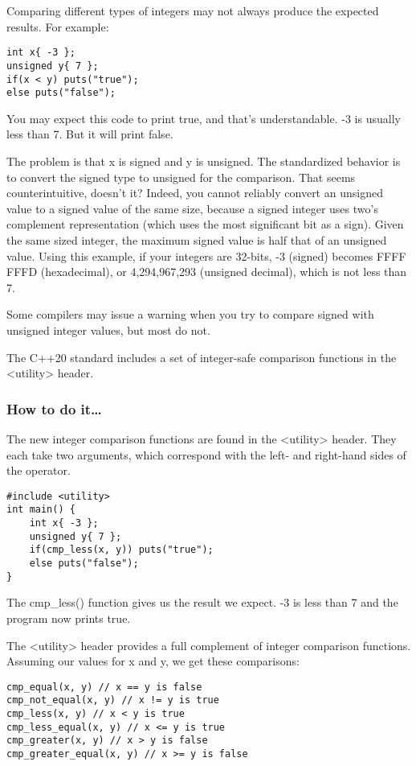 
Comparing different types of integers may not always produce the expected results. For example:

\begin{lstlisting}[style=styleCXX]
int x{ -3 };
unsigned y{ 7 };
if(x < y) puts("true");
else puts("false");
\end{lstlisting}

You may expect this code to print true, and that's understandable. -3 is usually less than 7. But it will print false.

The problem is that x is signed and y is unsigned. The standardized behavior is to convert the signed type to unsigned for the comparison. That seems counterintuitive, doesn't it? Indeed, you cannot reliably convert an unsigned value to a signed value of the same size, because a signed integer uses two's complement representation (which uses the most significant bit as a sign). Given the same sized integer, the maximum signed value is half that of an unsigned value. Using this example, if your integers are 32-bits, -3 (signed) becomes FFFF FFFD (hexadecimal), or 4,294,967,293 (unsigned decimal), which is not less than 7.

Some compilers may issue a warning when you try to compare signed with unsigned integer values, but most do not.

The C++20 standard includes a set of integer-safe comparison functions in the <utility> header.

\subsubsection{How to do it…}

The new integer comparison functions are found in the <utility> header. They each take two arguments, which correspond with the left- and right-hand sides of the operator.

\begin{lstlisting}[style=styleCXX]
#include <utility>
int main() {
	int x{ -3 };
	unsigned y{ 7 };
	if(cmp_less(x, y)) puts("true");
	else puts("false");
}
\end{lstlisting}

The cmp\_less() function gives us the result we expect. -3 is less than 7 and the program now prints true.

The <utility> header provides a full complement of integer comparison functions. Assuming our values for x and y, we get these comparisons:

\begin{lstlisting}[style=styleCXX]
cmp_equal(x, y) // x == y is false
cmp_not_equal(x, y) // x != y is true
cmp_less(x, y) // x < y is true
cmp_less_equal(x, y) // x <= y is true
cmp_greater(x, y) // x > y is false
cmp_greater_equal(x, y) // x >= y is false
\end{lstlisting}

